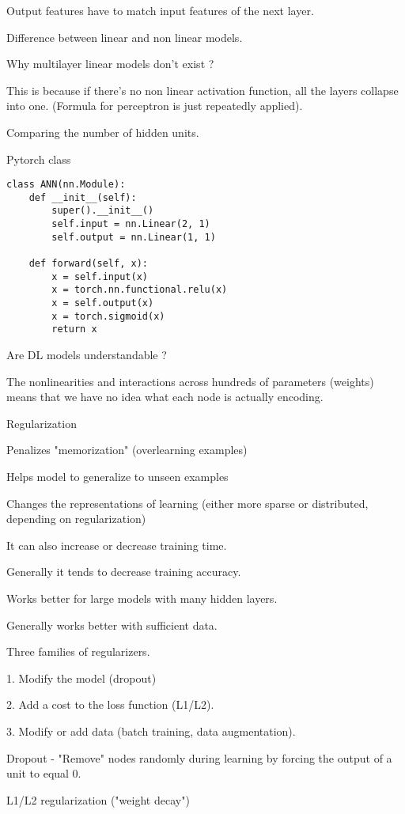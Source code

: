 \documentclass[30pt, a4]{article}
\begin{document}
Output features have to match input features of the next layer. 

Difference between linear and non linear models.

Why multilayer linear models don't exist ?

This is because if there's no non linear activation function, all the layers 
collapse into one. (Formula for perceptron is just repeatedly applied).

Comparing the number of hidden units.

Pytorch class

\begin{lstlisting}
class ANN(nn.Module):
    def __init__(self):
        super().__init__()
        self.input = nn.Linear(2, 1)
        self.output = nn.Linear(1, 1)
    
    def forward(self, x):
        x = self.input(x)
        x = torch.nn.functional.relu(x)
        x = self.output(x)
        x = torch.sigmoid(x)
        return x

\end{lstlisting}
Are DL models understandable ?

The nonlinearities and interactions across hundreds of parameters (weights)
means that we have no idea what each node is actually encoding.

Regularization

Penalizes "memorization" (overlearning examples)

Helps model to generalize to unseen examples

Changes the representations of learning (either more sparse or distributed, 
depending on regularization)

It can also increase or decrease training time. 

Generally it tends to decrease training accuracy.

Works better for large models with many hidden layers.

Generally works better with sufficient data.

Three families of regularizers.

1. Modify the model (dropout)

2. Add a cost to the loss function (L1/L2).

3. Modify or add data (batch training, data augmentation).

Dropout - "Remove" nodes randomly during learning by forcing the output of a 
unit to equal 0.

L1/L2 regularization ("weight decay")
\end{document}
